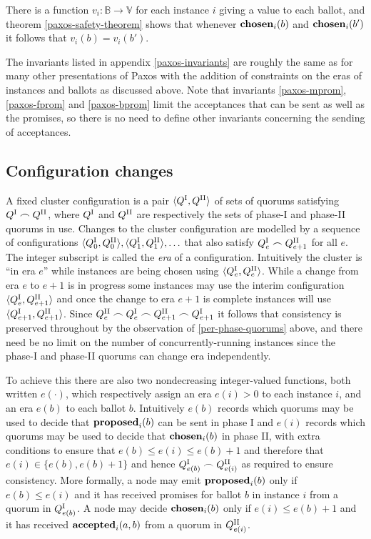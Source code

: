 \documentclass[journal]{IEEEtran}
\begin{document}
There is a function $v_i : \mathbb B \to \mathbb V$ for each instance $i$
giving a value to each ballot, and theorem \ref{paxos-safety-theorem} shows
that whenever $\mathbf{chosen}_{i}(b)$ and $\mathbf{chosen}_{i}(b')$ it follows that $v_i(b) =
v_i(b')$.

The invariants listed in appendix \ref{paxos-invariants} are roughly the same
as for many other presentations of Paxos with the addition of constraints on
the eras of instances and ballots as discussed above. Note that invariants
\ref{paxos-mprom}, \ref{paxos-fprom} and \ref{paxos-bprom} limit the
acceptances that can be sent as well as the promises, so there is no need to
define other invariants concerning the sending of acceptances.

\subsection{Configuration changes}\label{configuration-changes}

A fixed cluster configuration is a pair $\langle {Q}^\textrm{I}_{}, {Q}^\textrm{II}_{} \rangle$ of sets
of quorums satisfying ${Q}^\textrm{I}_{} \frown {Q}^\textrm{II}_{}$, where ${Q}^\textrm{I}_{}$ and ${Q}^\textrm{II}_{}$ are
respectively the sets of phase-I and phase-II quorums in use.  Changes to the
cluster configuration are modelled by a sequence of configurations $ \langle
{Q}^\textrm{I}_{0}, {Q}^\textrm{II}_{0} \rangle, \langle {Q}^\textrm{I}_{1}, {Q}^\textrm{II}_{1} \rangle, \ldots$ that also
satisfy ${Q}^\textrm{I}_{e} \frown {Q}^\textrm{II}_{e+1}$ for all $e$.  The integer subscript is called
the \textit{era} of a configuration.  Intuitively the cluster is ``in era $e$''
while instances are being chosen using $\langle {Q}^\textrm{I}_{e}, {Q}^\textrm{II}_{e}\rangle$. While
a change from era $e$ to $e+1$ is in progress some instances may use the
interim configuration $\langle {Q}^\textrm{I}_{e}, {Q}^\textrm{II}_{e+1} \rangle$ and once the change
to era $e+1$ is complete instances will use $\langle {Q}^\textrm{I}_{e+1}, {Q}^\textrm{II}_{e+1}
\rangle$. Since ${Q}^\textrm{II}_{e} \frown {Q}^\textrm{I}_{e} \frown {Q}^\textrm{II}_{e+1} \frown {Q}^\textrm{I}_{e+1}$ it
follows that consistency is preserved throughout by the observation of
\ref{per-phase-quorums} above, and there need be no limit on the number of
concurrently-running instances since the phase-I and phase-II quorums can
change era independently.

To achieve this there are also two nondecreasing integer-valued functions, both
written $e(\cdot)$, which respectively assign an era $e(i) > 0$ to each
instance $i$, and an era $e(b)$ to each ballot $b$. Intuitively $e(b)$ records
which quorums may be used to decide that $\mathbf{proposed}_{i}(b)$ can be sent in phase I
and $e(i)$ records which quorums may be used to decide that $\mathbf{chosen}_{i}(b)$ in
phase II, with extra conditions to ensure that ${e(b) \le e(i) \le e(b)+1}$ and
therefore that ${e(i) \in \{ e(b), e(b)+1 \}}$ and hence ${Q}^\textrm{I}_{e(b)} \frown
{Q}^\textrm{II}_{e(i)}$ as required to ensure consistency.  More formally, a node may emit
$\mathbf{proposed}_{i}(b)$ only if $e(b) \le e(i)$ and it has received promises for ballot
$b$ in instance $i$ from a quorum in ${Q}^\textrm{I}_{e(b)}$. A node may decide
$\mathbf{chosen}_{i}(b)$ only if ${e(i) \le e(b)+1}$ and it has received $\mathbf{accepted}_{i}(a,b)$
from a quorum in ${Q}^\textrm{II}_{e(i)}$.
\end{document}
